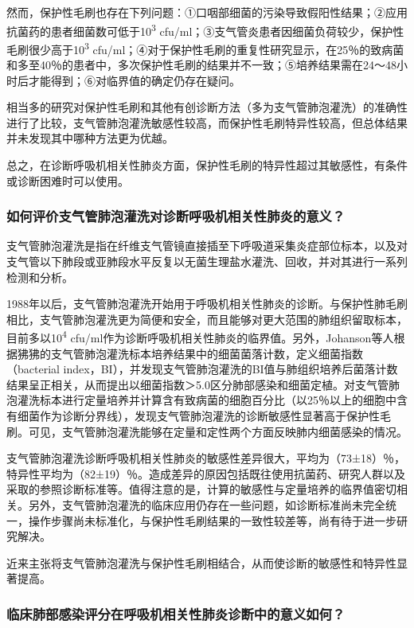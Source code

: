 然而，保护性毛刷也存在下列问题：①口咽部细菌的污染导致假阳性结果；②应用抗菌药的患者细菌数可低于10\textsuperscript{3}
cfu/ml；③支气管炎患者因细菌负荷较少，保护性毛刷很少高于10\textsuperscript{3}
cfu/ml；④对于保护性毛刷的重复性研究显示，在25％的致病菌和多至40％的患者中，多次保护性毛刷的结果并不一致；⑤培养结果需在24～48小时后才能得到；⑥对临界值的确定仍存在疑问。

相当多的研究对保护性毛刷和其他有创诊断方法（多为支气管肺泡灌洗）的准确性进行了比较，支气管肺泡灌洗敏感性较高，而保护性毛刷特异性较高，但总体结果并未发现其中哪种方法更为优越。

总之，在诊断呼吸机相关性肺炎方面，保护性毛刷的特异性超过其敏感性，有条件或诊断困难时可以使用。

\subsubsection{如何评价支气管肺泡灌洗对诊断呼吸机相关性肺炎的意义？}

支气管肺泡灌洗是指在纤维支气管镜直接插至下呼吸道采集炎症部位标本，以及对支气管以下肺段或亚肺段水平反复以无菌生理盐水灌洗、回收，并对其进行一系列检测和分析。

1988年以后，支气管肺泡灌洗开始用于呼吸机相关性肺炎的诊断。与保护性肺毛刷相比，支气管肺泡灌洗更为简便和安全，而且能够对更大范围的肺组织留取标本，目前多以10\textsuperscript{4}
cfu/ml作为诊断呼吸机相关性肺炎的临界值。另外，Johanson等人根据狒狒的支气管肺泡灌洗标本培养结果中的细菌菌落计数，定义细菌指数（bacterial
index，BI），并发现支气管肺泡灌洗的BI值与肺组织培养后菌落计数结果呈正相关，从而提出以细菌指数＞5.0区分肺部感染和细菌定植。对支气管肺泡灌洗标本进行定量培养并计算含有致病菌的细胞百分比（以25％以上的细胞中含有细菌作为诊断分界线），发现支气管肺泡灌洗的诊断敏感性显著高于保护性毛刷。可见，支气管肺泡灌洗能够在定量和定性两个方面反映肺内细菌感染的情况。

支气管肺泡灌洗诊断呼吸机相关性肺炎的敏感性差异很大，平均为（73±18）％，特异性平均为（82±19）％。造成差异的原因包括既往使用抗菌药、研究人群以及采取的参照诊断标准等。值得注意的是，计算的敏感性与定量培养的临界值密切相关。另外，支气管肺泡灌洗的临床应用仍存在一些问题，如诊断标准尚未完全统一，操作步骤尚未标准化，与保护性毛刷结果的一致性较差等，尚有待于进一步研究解决。

近来主张将支气管肺泡灌洗与保护性毛刷相结合，从而使诊断的敏感性和特异性显著提高。

\subsubsection{临床肺部感染评分在呼吸机相关性肺炎诊断中的意义如何？}

